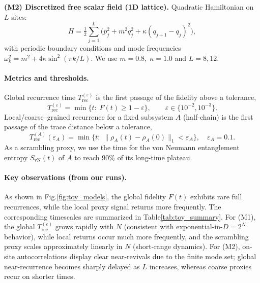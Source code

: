 \documentclass[12pt]{article}
\newcommand{\Trec}{T_{\text{rec}}}
\newcommand{\TrecA}{T^{(A)}_{\text{rec}}}
\theoremstyle{remark}
\begin{document}
\noindent
\textbf{(M2) Discretized free scalar field (1D lattice).}
Quadratic Hamiltonian on \(L\) sites:
\[
H=\tfrac12\sum_{j=1}^{L}\!\big(p_j^2+m^2 q_j^2+\kappa (q_{j+1}-q_j)^2\big),
\]
with periodic boundary conditions and mode frequencies
\(\omega_k^2=m^2+4\kappa\sin^2(\pi k/L)\).
We use \(m=0.8,\;\kappa=1.0\) and \(L=8,12\).

\paragraph{Metrics and thresholds.}
Global recurrence time \(\Trec^{(\varepsilon)}\) is the first passage of the fidelity above a tolerance,
\[
\Trec^{(\varepsilon)}=\min\{t:\; F(t)\ge 1-\varepsilon\},\qquad \varepsilon\in\{10^{-2},10^{-3}\}.
\]
Local/coarse–grained recurrence for a fixed subsystem \(A\) (half-chain) is the first passage of the trace distance below a tolerance,
\[
\TrecA(\varepsilon_A)=\min\{t:\;\|\rho_A(t)-\rho_A(0)\|_1<\varepsilon_A\},\quad \varepsilon_A=0.1.
\]
As a scrambling proxy, we use the time for the von Neumann entanglement entropy \(S_{\mathrm{vN}}(t)\) of \(A\) to reach \(90\%\) of its long-time plateau.

\paragraph{Key observations (from our runs).}
As shown in Fig.\ref{fig:toy_models}, the global fidelity $F(t)$ exhibits rare full recurrences, while the local proxy signal returns more frequently. The corresponding timescales are summarized in Table\ref{tab:toy_summary}.
For (M1), the global \(\Trec^{(\varepsilon)}\) grows rapidly with \(N\) (consistent with exponential-in-\(D=2^N\) behavior),
while local returns occur much more frequently, and the scrambling proxy scales approximately linearly in \(N\) (short-range dynamics).
For (M2), on-site autocorrelations display clear near-revivals due to the finite mode set; global near-recurrence becomes sharply delayed as \(L\) increases, whereas coarse proxies recur on shorter times.
\end{document}
